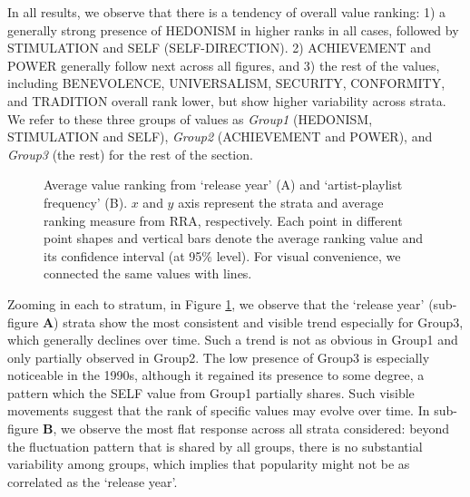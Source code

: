 \documentclass{article}
\begin{document}
In all results, we observe that there is a tendency of overall value ranking: 1) a generally strong presence of HEDONISM in higher ranks in all cases, followed by STIMULATION and SELF (SELF-DIRECTION). 2) ACHIEVEMENT and POWER generally follow next across all figures, and 3) the rest of the values, including BENEVOLENCE, UNIVERSALISM, SECURITY, CONFORMITY, and TRADITION overall rank lower, but show higher variability across strata. We refer to these three groups of values as \emph{Group1} (HEDONISM, STIMULATION and SELF), \emph{Group2} (ACHIEVEMENT and POWER), and \emph{Group3} (the rest) for the rest of the section.

\begin{figure}
 \centerline{}
 \caption{Average value ranking from `release year' (A) and `artist-playlist frequency' (B). $x$ and $y$ axis represent the strata and average ranking measure from RRA, respectively.
 Each point in different point shapes and vertical bars denote the average ranking value and its confidence interval (at 95\% level). For visual convenience, we connected the same values with lines.
 }
 \label{fig:avg_rank_trend_12}
\end{figure}

Zooming in each to stratum, in Figure \ref{fig:avg_rank_trend_12}, we observe that the `release year' (sub-figure \textbf{A}) strata show the most consistent and visible trend especially for Group3, which generally declines over time. Such a trend is not as obvious in Group1 and only partially observed in Group2. The low presence of Group3 is especially noticeable in the 1990s, although it regained its presence to some degree, a pattern which the SELF value from Group1 partially shares. Such visible movements suggest that the rank of specific values may evolve over time. In sub-figure \textbf{B}, we observe the most flat response across all strata considered: beyond the fluctuation pattern that is shared by all groups, there is no substantial variability among groups, which implies that popularity might not be as correlated as the `release year'.
\end{document}
